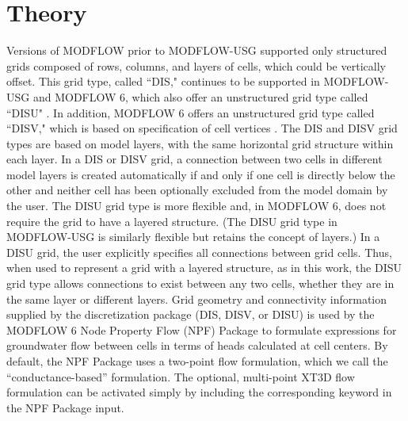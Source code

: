 \documentclass{article}
\begin{document}
\section*{Theory}

Versions of MODFLOW prior to MODFLOW-USG \citep{modflowusg} supported only structured grids composed of rows, columns, and layers of cells, which could be vertically offset. This grid type, called ``DIS," continues to be supported in MODFLOW-USG and MODFLOW 6, which also offer an unstructured grid type called ``DISU" \citep{modflowusg, modflow6gwf}. In addition, MODFLOW 6 offers an  unstructured grid type called ``DISV," which is based on specification of cell vertices \citep{modflow6gwf}. The DIS and DISV grid types are based on model layers, with the same horizontal grid structure within each layer. In a DIS or DISV grid, a connection between two cells in different model layers is created automatically if and only if one cell is directly below the other and neither cell has been optionally excluded from the model domain by the user. The DISU grid type is more flexible and, in MODFLOW 6, does not require the grid to have a layered structure. (The DISU grid type in MODFLOW-USG is similarly flexible but retains the concept of layers.) In a DISU grid, the user explicitly specifies all connections between grid cells. Thus, when used to represent a grid with a layered structure, as in this work, the DISU grid type allows connections to exist between any two cells, whether they are in the same layer or different layers. Grid geometry and connectivity information supplied by the discretization package (DIS, DISV, or DISU) is used by the MODFLOW 6 Node Property Flow (NPF) Package to formulate expressions for groundwater flow between cells in terms of heads calculated at cell centers. By default, the NPF Package uses a two-point flow formulation, which we call the ``conductance-based'' formulation. The optional, multi-point XT3D flow formulation can be activated simply by including the corresponding keyword in the NPF Package input.
\end{document}

